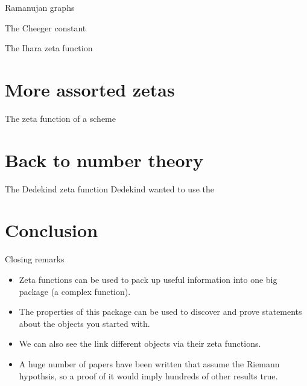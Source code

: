 \documentclass{beamer}
\begin{document}
\begin{frame}{Ramanujan graphs}
\begin{block}{The Cheeger constant}

\end{block}
\end{frame}

\begin{frame}{The Ihara zeta function}
\begin{block}{}
\end{block}
\end{frame}

\section[More zetas]{More assorted zetas}

\begin{frame}{The zeta function of a scheme}
\begin{block}{}
\end{block}
\end{frame}

\section[Number theory again]{Back to number theory}
\begin{frame}{The Dedekind zeta function}
Dedekind wanted to use the 
\begin{block}{}
\end{block}
\end{frame}

\section{Conclusion}
\begin{frame}{Closing remarks}
\begin{itemize}
\item Zeta functions can be used to pack up useful information into one big package (a complex function).
\pause\item The properties of this package can be used to discover and prove statements about the objects you started with.
\pause\item We can also see the link different objects via their zeta functions.
\pause\item A huge number of papers have been written that assume the Riemann hypothsis, so a proof of it would imply hundreds of other results true.
\end{itemize}
\end{frame}
\end{document}
